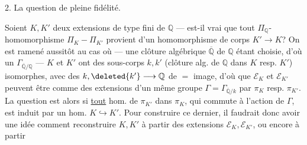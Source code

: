 2. La question de pleine fidélité.

Soient $K,K'$ deux extensions de type fini de $\mathbb Q$ --- est-il vrai que tout $\Pi_{\mathbb Q}$-homomorphisme $\Pi_K-\Pi_{K'}$ provient d'un homomorphisme de corps $K'\longrightarrow K$? On est ramené aussitôt au cas où --- une clôture algébrique $\overline{\mathbb Q}$ de $\mathbb Q$ étant choisie, d'où un $\Gamma_{\overline{\mathbb Q}/\mathbb Q}$ --- $K$ et $K'$ ont des sous-corps $k,k'$ (clôture alg. de $\mathbb Q$ dans $K$ resp. $K'$) isomorphes, avec des   $k,\deleted{k'}\longrightarrow\mathbb Q$ de $=$ image, d'où que $\mathcal E_K$ et $\mathcal E_{K'}$ peuvent être  comme des extensions d'un même groupe $\Gamma=\Gamma_{\overline{\mathbb Q}/k}$ par $\pi_K$ resp. $\pi_{K'}$. La question est alors si \uline{tout} hom. de $\pi_{K'}$ dans $\pi_K$, qui commute à l'action de $\Gamma$, est induit par un hom. $K\hookrightarrow K'$. Pour construire ce dernier, il faudrait donc avoir une idée comment reconstruire $K,K'$ à partir des extensions $\mathcal E_K,\mathcal E_{K'}$, ou encore à partir
